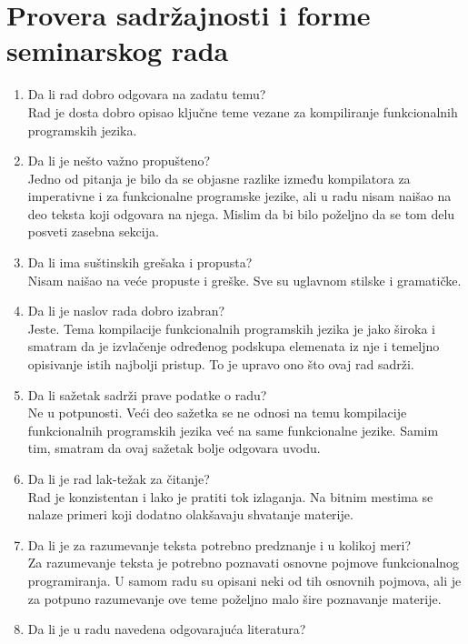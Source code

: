 \documentclass[a4paper]{report}
\begin{document}
\section{Provera sadržajnosti i forme seminarskog rada}

\begin{enumerate}
\item Da li rad dobro odgovara na zadatu temu?\\
Rad je dosta dobro opisao ključne teme vezane za kompiliranje funkcionalnih programskih jezika. 
\item Da li je nešto važno propušteno?\\
Jedno od pitanja je bilo da se objasne razlike između kompilatora za imperativne i za funkcionalne programske jezike, ali u radu nisam naišao na  deo teksta koji odgovara na njega. Mislim da bi bilo poželjno da se tom delu posveti zasebna sekcija.
\item Da li ima suštinskih grešaka i propusta?\\
Nisam naišao na veće propuste i greške. Sve su uglavnom stilske i gramatičke.
\item Da li je naslov rada dobro izabran?\\
Jeste. Tema kompilacije funkcionalnih programskih jezika je jako široka i smatram da je izvlačenje određenog podskupa elemenata iz nje i temeljno opisivanje istih najbolji pristup. To je upravo ono što ovaj rad sadrži.
\item Da li sažetak sadrži prave podatke o radu?\\
Ne u potpunosti. Veći deo sažetka se ne odnosi na temu kompilacije funkcionalnih programskih jezika već na same funkcionalne jezike. Samim tim, smatram da ovaj sažetak bolje odgovara uvodu.
\item Da li je rad lak-težak za čitanje?\\
Rad je konzistentan i lako je pratiti tok izlaganja. Na bitnim mestima se nalaze primeri koji dodatno olakšavaju shvatanje materije.
\item Da li je za razumevanje teksta potrebno predznanje i u kolikoj meri?\\
Za razumevanje teksta je potrebno poznavati osnovne pojmove funkcionalnog programiranja. U samom radu su opisani neki od tih osnovnih pojmova, ali je za potpuno razumevanje ove teme poželjno malo šire poznavanje materije.  
\item Da li je u radu navedena odgovarajuća literatura?\\

\end{enumerate}
\end{document}
